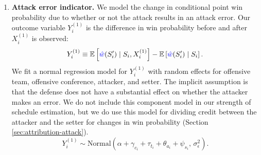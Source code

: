 \documentclass[USenglish]{article}
\theoremstyle{dgthm}
\theoremstyle{dgdef}
\begin{document}
\begin{enumerate}
    \item
        {\bf Attack error indicator.} We model the change in conditional point win probability due to whether or not the attack results in an attack error. Our outcome variable $Y_i^{(1)}$ is the difference in win probability before and after $X_i^{(1)}$ is observed:
        \begin{equation*}
            Y_i^{(1)} \equiv \mathbb{E}\left[\textcolor{blue}{\hat w}(S'_i) \mid S_i, X_i^{(1)}\right] - \mathbb{E}\left[\textcolor{blue}{\hat w}(S'_i) \mid S_i\right].
        \end{equation*}
        We fit a normal regression model for $Y_i^{(1)}$ with random effects for offensive team, offensive conference, attacker, and setter. The implicit assumption is that the defense does not have a substantial effect on whether the attacker makes an error. We do not include this component model in our strength of schedule estimation, but we do use this model for dividing credit between the attacker and the setter for changes in win probability (Section \ref{sec:attribution-attack}).
        \begin{equation}
        \label{eqn:attack-model-1}
            Y_i^{(1)} \sim \mbox{Normal}\left(
                \alpha + \gamma_{c_i} + \tau_{t_i} + \theta_{a_i} + \psi_{s_i},\,
                \sigma^2_\epsilon
            \right).
        \end{equation}


\end{enumerate}
\end{document}
